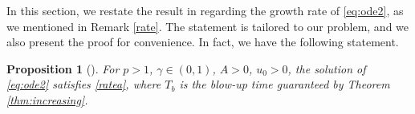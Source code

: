 \documentclass[12pt]{amsart}%
\newtheorem{pro}[thm]{Proposition}
\theoremstyle{definition}
\theoremstyle{remark}
\renewcommand{\leq}{\leqslant}
\renewcommand{\geq}{\geqslant}
\begin{document}
In this section, we restate the result in \cite{roberts1996growth} regarding the growth rate of \eqref{eq:ode2}, as we mentioned in Remark \ref{rate}. The statement is tailored to our problem, and we also present the proof for convenience.
In fact, we have the following statement.
\begin{pro}[\cite{roberts1996growth}]
For $p>1$, $\gamma\in (0,1)$, $A>0$, $u_0>0$, the solution of \eqref{eq:ode2} satisfies \eqref{ratea}, where $T_b$ is the blow-up time guaranteed by Theorem \ref{thm:increasing}.
\end{pro}
\end{document}

